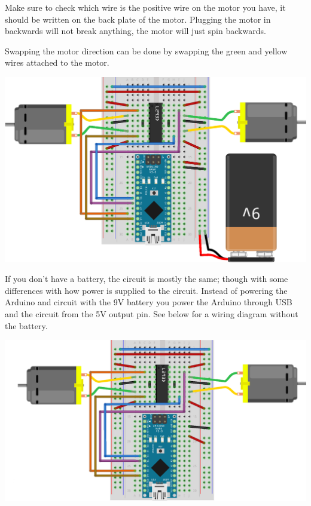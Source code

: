 \documentclass[../TinyBot.tex]{subfiles}
\begin{document}
Make sure to check which wire is the positive wire on the motor you have, it should be written on the back plate of the motor. Plugging the motor in backwards will not break anything, the motor will just spin backwards. 

Swapping the motor direction can be done by swapping the green and yellow wires attached to the motor. 


\begin{center}
    \includegraphics[width=\textwidth]{resources/H-bridge-nano_bb.png}
    \label{fig:schematic-hbridge-battery}
\end{center}

If you don't have a battery, the circuit is mostly the same; though with some differences with how power is supplied to the circuit. Instead of powering the Arduino and circuit with the 9V battery you power the Arduino through USB and the circuit from the 5V output pin. See below for a wiring diagram without the battery.


\begin{center}
    \includegraphics[width=\textwidth]{resources/H-bridge-nano-without-battery_bb.png}
    \label{fig:schematic-hbridge-nobattery}
\end{center}
\end{document}
